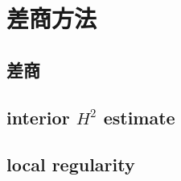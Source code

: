\section{差商方法}
\label{b2:sec:1601}


\subsection{差商}
\label{b2:subsec:160101}

\subsection{interior \texorpdfstring{\(H^2\)}{H2} estimate}
\label{b2:subsec:160102}

\subsection{local regularity}
\label{b2:subsec:160103}


